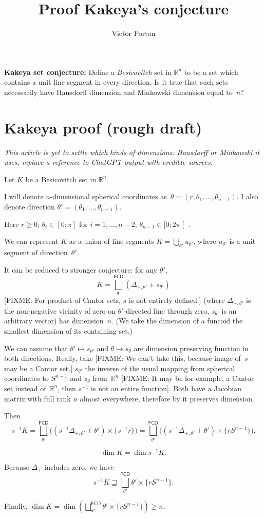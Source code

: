 \documentclass{amsart}
\title{Proof Kakeya's conjecture}
\author{Victor Porton}
\newcommand{\funcoids}{\mathsf{FCD}}
\begin{document}
\textbf{Kakeya set conjecture:} Define a \emph{Besicovitch} set in $\mathbb{R}^n$ to be a set which contains a unit line segment in every direction. Is it true that such sets necessarily have Hausdorff dimension and Minkowski dimension equal to~$n$?

\section{Kakeya proof (rough draft)}

\emph{This article is yet to settle which kinds of dimensions: Hausdorff or Minkowski it uses, replace a reference to ChatGPT output with credible sources.}

Let $K$ be a Besicovitch set in $\mathbb{R}^n$.

I will denote $n$-dimensional spherical coordinates as~$\theta=(r, \theta_1,\dots,\theta_{n-1})$.
I also denote direction $\theta'=(\theta_1,\dots,\theta_{n-1})$.

Here $r\geq 0$; $\theta_i\in[0;\pi]$ for $i=1,\dots,n-2$; $\theta_{n-1}\in[0;2\pi\mathclose[$ .

We can represent $K$ as a union of line segments $K = \bigcup_{\theta'} u_{\theta'}$, where $u_{\theta'}$ is a unit segment of direction~$\theta'$.

It can be reduced to stronger conjecture: for any $\theta'$, \[ K = \bigsqcup^{\funcoids}_{\theta'} (\Delta_{+,\theta'}+s_{\theta'}) \] 
[FIXME: For product of Cantor sets, $s$ is not entirely defined.]
(where $\Delta_{+,\theta'}$ is the non-ne\-ga\-ti\-ve vicinity of zero on $\theta'$-di\-rec\-ted line through zero, $s_{\theta'}$ is an arbitrary vector) has dimension~$n$. (We take the dimension of a funcoid the smallest dimension of its containing set.)

We can assume that $\theta'\mapsto s_{\theta'}$ and $\theta\mapsto s_{\theta}$ are dimension preserving function in both directions. Really,
take [FIXME: We can't take this, because image of~$s$ may be a Cantor set.] $s_{\theta'}$ the inverse of the usual mapping from spherical coordinates to $S^{n-1}$ and $s_{\theta}$ from~$\mathbb{R}^n$ [FIXME: It may be for example, a Cantor set instead of~$\mathbb{R}^n$, then $s^{-1}$ is not an entire function]. Both have
a Jacobian matrix with full rank $n$ almost everywhere, therefore by \cite{gpt-preserve-dim} it preserves dimension.

Then \[ s^{-1}K = \bigsqcup^{\funcoids}_{\theta'} \bigl((s^{-1}\Delta_{+,\theta'}+\theta')\times\{s^{-1}r\}\bigr) =
\bigsqcup^{\funcoids}_{\theta'} \bigl((s^{-1}\Delta_{+,\theta'}+\theta')\times\{rS^{n-1}\}\bigr). \]

\[ \dim K = \dim s^{-1}K. \]

Because $\Delta_{+}$ includes zero, we have \[ s^{-1}K \sqsupseteq \bigsqcup^{\funcoids}_{\theta'} \theta' \times\{rS^{n-1}\}. \]

Finally, $\dim K=\dim\left(\bigsqcup^{\funcoids}_{\theta'} \theta' \times\{rS^{n-1}\}\right)\geq n$.



\end{document}
